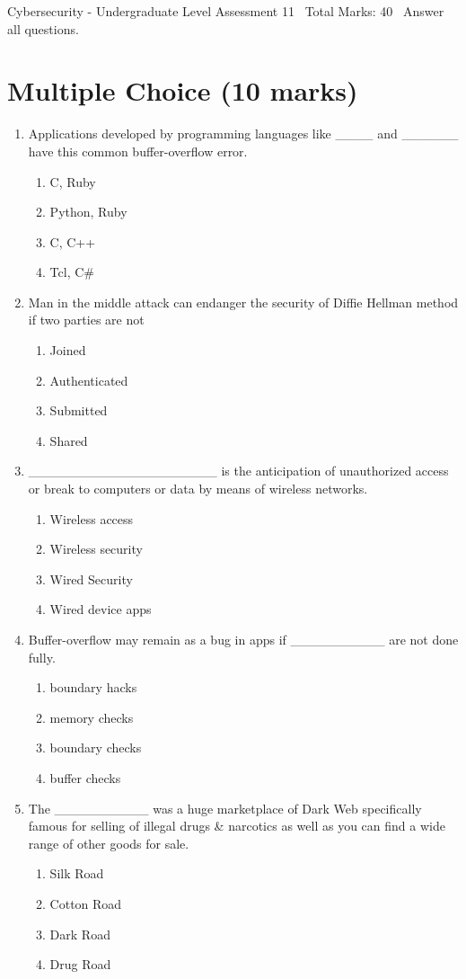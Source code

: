 \documentclass[12pt]{article}
\begin{document}
\begin{center}
Cybersecurity - Undergraduate Level Assessment 11 \
Total Marks: 40 \
Answer all questions.
\end{center}

\section*{Multiple Choice (10 marks)}
\begin{enumerate}[label=\arabic*.]
\item Applications developed by programming languages like \_\_\_\_ and \_\_\_\_\_\_ have this common buffer-overflow error.
\begin{enumerate}[label=(\alph*)]
    \item C, Ruby
    \item Python, Ruby
    \item C, C++
    \item Tcl, C\#
\end{enumerate}
\item Man in the middle attack can endanger the security of Diffie Hellman method if two parties are not
\begin{enumerate}[label=(\alph*)]
    \item Joined
    \item Authenticated
    \item Submitted
    \item Shared
\end{enumerate}
\item \_\_\_\_\_\_\_\_\_\_\_\_\_\_\_\_\_\_\_\_ is the anticipation of unauthorized access or break to computers or data by means of wireless networks.
\begin{enumerate}[label=(\alph*)]
    \item Wireless access
    \item Wireless security
    \item Wired Security
    \item Wired device apps
\end{enumerate}
\item Buffer-overflow may remain as a bug in apps if \_\_\_\_\_\_\_\_\_\_ are not done fully.
\begin{enumerate}[label=(\alph*)]
    \item boundary hacks
    \item memory checks
    \item boundary checks
    \item buffer checks
\end{enumerate}
\item The \_\_\_\_\_\_\_\_\_\_ was a huge marketplace of Dark Web specifically famous for selling of illegal drugs \& narcotics as well as you can find a wide range of other goods for sale.
\begin{enumerate}[label=(\alph*)]
    \item Silk Road
    \item Cotton Road
    \item Dark Road
    \item Drug Road
\end{enumerate}
\end{enumerate}
\end{document}
